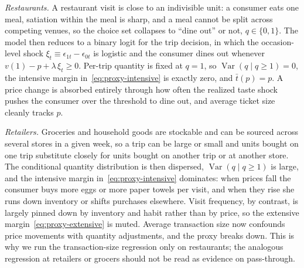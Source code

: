 \documentclass[main.tex]{subfiles}
\begin{document}
\emph{Restaurants.} A restaurant visit is close to an indivisible unit: a consumer eats one meal, satiation within the meal is sharp, and a meal cannot be split across competing venues, so the choice set collapses to ``dine out'' or not, $q \in \{0, 1\}$.
The model then reduces to a binary logit for the trip decision, in which the occasion-level shock $\xi_{t} \equiv \epsilon_{1t} - \epsilon_{0t}$ is logistic and the consumer dines out whenever $v(1) - p + \lambda\,\xi_{t} \geq 0$.
Per-trip quantity is fixed at $q = 1$, so $\operatorname{Var}(q \mid q \geq 1) = 0$, the intensive margin in~\eqref{eq:proxy-intensive} is exactly zero, and $\bar{t}(p) = p$.
A price change is absorbed entirely through how often the realized taste shock pushes the consumer over the threshold to dine out, and average ticket size cleanly tracks $p$.

\emph{Retailers.} Groceries and household goods are stockable and can be sourced across several stores in a given week, so a trip can be large or small and units bought on one trip substitute closely for units bought on another trip or at another store.
The conditional quantity distribution is then dispersed, $\operatorname{Var}(q \mid q \geq 1)$ is large, and the intensive margin in~\eqref{eq:proxy-intensive} dominates: when prices fall the consumer buys more eggs or more paper towels per visit, and when they rise she runs down inventory or shifts purchases elsewhere.
Visit frequency, by contrast, is largely pinned down by inventory and habit rather than by price, so the extensive margin~\eqref{eq:proxy-extensive} is muted.
Average transaction size now confounds price movements with quantity adjustments, and the proxy breaks down.
This is why we run the transaction-size regression only on restaurants; the analogous regression at retailers or grocers should not be read as evidence on pass-through.
\end{document}
